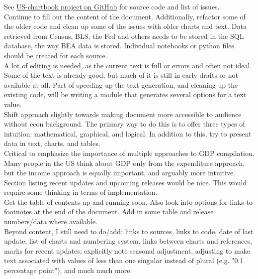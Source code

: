 \documentclass{report}
\begin{document}
\begin{minipage}{0.76\textwidth}

See \href{https://github.com/bdecon/US-chartbook}{US-chartbook project on GitHub} for source code and list of issues.\\

\small Continue to fill out the content of the document. Additionally, refactor some of the older code and clean up some of the issues with older charts and text. Data retrieved from Census, BLS, the Fed and others needs to be stored in the SQL database, the way BEA data is stored. Individual notebooks or python files should be created for each source.\\

A lot of editing is needed, as the current text is full or errors and often not ideal. Some of the text is already good, but much of it is still in early drafts or not available at all. Part of speeding up the text generation, and cleaning up the existing code, will be writing a module that generates several options for a text value.\\

Shift approach slightly towards making document more accessible to audience without econ background. The primary way to do this is to offer three types of intuition: mathematical, graphical, and logical. In addition to this, try to present data in text, charts, and tables. \\

Critical to emphasize the importance of multiple approaches to GDP compilation. Many people in the US think about GDP only from the expenditure approach, but the income approach is equally important, and arguably more intuitive. \\

Section listing recent updates and upcoming releases would be nice. This would require some thinking in terms of implementation. \\

Get the table of contents up and running soon. Also look into options for links to footnotes at the end of the document. Add in some table and release numbers/data where available.\\

Beyond content, I still need to do/add: links to sources, links to code, date of last update, list of charts and numbering system, links between charts and references, marks for recent updates, explicitly note seasonal adjustment, adjusting to make text associated with values of less than one singular instead of plural (e.g. "0.1 percentage point"), and much much more. \\


\end{minipage}
\end{document}
